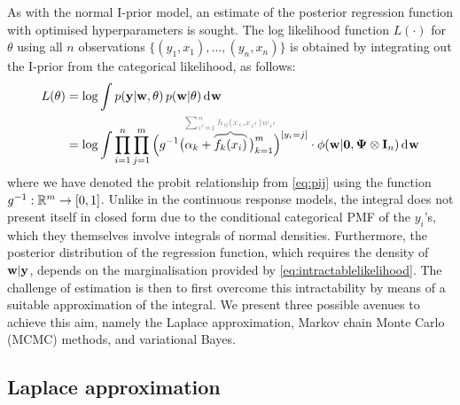 
As with the normal I-prior model, an estimate of the posterior regression function with optimised hyperparameters is sought.
The log likelihood function $L(\cdot)$ for $\theta$ using all $n$ observations $\{(y_1,x_1),\dots,(y_n,x_n)\}$ is obtained by integrating out the I-prior from the categorical likelihood, as follows:
\begin{align}
  L(\theta) 
  &= \log \int p(\by | \bw, \theta) \, p(\bw|\theta) \dint \bw \nonumber \\
  &= \log \int \prod_{i=1}^n \prod_{j=1}^m \Big( g^{-1}\big(\alpha_k + 
  \greyoverbrace{f_k(x_i)}{\hidewidth\sum_{i'=1}^n h_\eta(x_i,x_{i'})w_{i'}\hidewidth}
  \,\big)_{k=1}^m \Big)^{[y_i=j]} \cdot \phi(\bw|\bzero,  \bPsi \otimes \bI_n ) \dint \bw \label{eq:intractablelikelihood}
\end{align}
where we have denoted the probit relationship from \eqref{eq:pij} using the function $g^{-1}:\mathbb{R}^m \to [0,1]$.
Unlike in the continuous response models, the integral does not present itself in closed form due to the conditional categorical PMF of the $y_i$'s, which they themselves involve integrals of normal densities.
Furthermore, the posterior distribution of the regression function, which requires the density of ${\mathbf w}|{\mathbf y}$, depends on the marginalisation provided by \cref{eq:intractablelikelihood}.
The challenge of estimation is then to first overcome this intractability by means of a suitable approximation of the integral.
We present three possible avenues to achieve this aim, namely the Laplace approximation, Markov chain Monte Carlo (MCMC) methods, and  variational Bayes.


\subsection{Laplace approximation}

